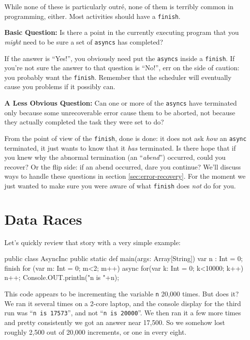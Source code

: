 While none of these is particularly outr\'{e}, none of them is terribly common in \Xten{}
programming, either.   Most activities should have a {\tt finish}.

{\bf Basic Question:} Is there a point in the currently executing program that
you {\em might} need to be sure a set of {\tt asyncs} has completed?  

If the
answer is ``Yes!'',   you obviously need put the {\tt asyncs} inside a {\tt finish}.
If you're not sure the answer to that question is ``No!'', err on the side of caution:
you probably want the {\tt finish}.   Remember that the scheduler will eventually
cause you problems if it possibly can.

{\bf A Less Obvious Question:} Can one or
more of the {\tt asyncs} have terminated only because some unrecoverable
error cause them to be aborted, not because they actually completed the task
they were set to do?  

From the point of view of the {\tt finish}, done is
done: it does not ask {\em how} an {\tt async} terminated, it just wants to know
that it {\em has} terminated.  Is there hope that if you knew why the abnormal
termination (an ``{\em abend}'') occurred, could you recover? 
Or the flip side: if an abend occurred, dare you continue?  We'll discuss ways
to handle these questions in section \ref{sec:error-recovery}.  For the moment
we just wanted to make sure you were aware of what {\tt finish} does {\em not} do for you.

\section{Data Races}
 Let's quickly review that story with a very simple example:
\begin{xtennum}[]
public class AsyncInc {
    public static def main(args: Array[String]) {
       var n : Int = 0;
       finish for (var m: Int = 0; m<2; m++) {
          async for(var k: Int = 0; k<10000; k++) n++; 
       }
       Console.OUT.println("n is "+n);
    }
}
\end{xtennum}
This code appears to be incrementing the variable {\tt n} 20,000 times.  
But does it?  We ran it several times on a 2-core laptop, and the console display
for the third run was ``{\tt n is 17573}'', and not ``{\tt n is 20000}''.
We then ran it a few more times and pretty consistently we got an answer
near 17,500.  So we somehow lost roughly 2,500 out of 20,000 increments,
or one in every eight.

